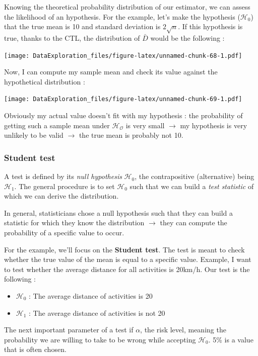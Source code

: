 \documentclass[
]{book}
\providecommand{\tightlist}{%
  \setlength{\itemsep}{0pt}\setlength{\parskip}{0pt}}
\begin{document}
Knowing the theoretical probability distribution of our estimator, we can assess the likelihood of an hypothesis. For the example, let's make the hypothesis (\(\mathcal{H_0}\)) that the true mean is 10 and standard deviation is \(2\sqrt{n}\). If this hypothesis is true, thanks to the CTL, the distribution of \(\bar{D}\) would be the following :

\texttt{[image: DataExploration\_files/figure-latex/unnamed-chunk-68-1.pdf]}

Now, I can compute my sample mean and check its value against the hypothetical distribution :

\texttt{[image: DataExploration\_files/figure-latex/unnamed-chunk-69-1.pdf]}

Obviously my actual value doesn't fit with my hypothesis : the probability of getting such a sample mean under \(\mathcal{H_O}\) is very small \(\rightarrow\) my hypothesis is very unlikely to be valid \(\rightarrow\) the true mean is probably not 10.

\hypertarget{student-test}{%
\subsubsection{Student test}\label{student-test}}

A test is defined by its \emph{null hypothesis} \(\mathcal{H_0}\), the contrapositive (alternative) being \(\mathcal{H_1}\). The general procedure is to set \(\mathcal{H_0}\) such that we can build a \emph{test statistic} of which we can derive the distribution.

In general, statisticians chose a null hypothesis such that they can build a statistic for which they know the distribution \(\rightarrow\) they can compute the probability of a specific value to occur.

For the example, we'll focus on the \textbf{Student test}. The test is meant to check whether the true value of the mean is equal to a specific value. Example, I want to test whether the average distance for all activities is 20km/h. Our test is the following :

\begin{itemize}
\tightlist
\item
  \(\mathcal{H_0}\) : The average distance of activities is 20
\item
  \(\mathcal{H_1}\) : The average distance of activities is not 20
\end{itemize}

The next important parameter of a test if \(\alpha\), the risk level, meaning the probability we are willing to take to be wrong while accepting \(\mathcal{H_0}\). 5\% is a value that is often chosen.
\end{document}
